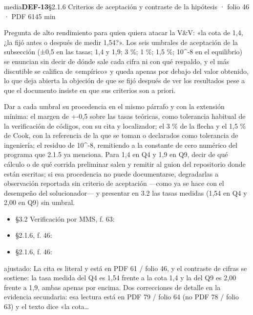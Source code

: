 \begin{ficha}{media}{\casilla\textbf{DEF-13}\quad{}\quad §2.1.6 Criterios de aceptación y contraste de la hipótesis · folio 46 · PDF 61\hfill 45 min}
\par
{}Pregunta de alto rendimiento para quien quiera atacar la V\&V: «la cota de 1,4, ¿la fijó antes o después de medir 1,54?». Los seis umbrales de aceptación de la subsección (±0,5 en las tasas; 1,4 y 1,9; 3 \%; 1 \%; 1,5 \%; 10\textasciicircum{}-8 en el equilibrio) se enuncian sin decir de dónde sale cada cifra ni con qué respaldo, y el más discutible se califica de «empírico» y queda apenas por debajo del valor obtenido, lo que deja abierta la objeción de que se fijó después de ver los resultados pese a que el documento insiste en que sus criterios son a priori.\par
{}Dar a cada umbral su procedencia en el mismo párrafo y con la extensión mínima: el margen de +-0,5 sobre las tasas teóricas, como tolerancia habitual de la verificación de códigos, con su cita y localizador; el 3 \% de la flecha y el 1,5 \% de Cook, con la referencia de la que se toman o declarados como tolerancia de ingeniería; el residuo de 10\textasciicircum{}-8, remitiendo a la constante de cero numérico del programa que 2.1.5 ya menciona. Para 1,4 en Q4 y 1,9 en Q9, decir de qué cálculo o de qué corrida preliminar salen y remitir al guion del repositorio donde están escritas; si esa procedencia no puede documentarse, degradarlas a observación reportada sin criterio de aceptación —como ya se hace con el desempeño del solucionador— y presentar en 3.2 las tasas medidas (1,54 en Q4 y 2,00 en Q9) sin umbral.\par
{}\begin{itemize}[leftmargin=1.2em,itemsep=1pt,topsep=1pt]
\item {\small §3.2 Verificación por MMS, f. 63: }
\item {\small §2.1.6, f. 46: }
\item {\small §2.1.6, f. 46: }
\end{itemize}
{\footnotesize\color{gris}ajustado: La cita es literal y está en PDF 61 /\allowbreak{} folio 46, y el contraste de cifras se sostiene: la tasa medida del Q4 es 1,54 frente a la cota 1,4 y la del Q9 es 2,00 frente a 1,9, ambas apenas por encima. Dos correcciones de detalle en la evidencia secundaria: esa lectura está en PDF 79 /\allowbreak{} folio 64 (no PDF 78 /\allowbreak{} folio 63) y el texto dice «la cota…\par}
\end{ficha}
